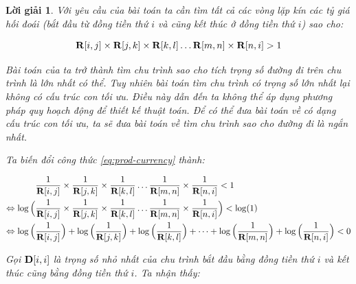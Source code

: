 \documentclass[14pt, a4paper]{article}
\theoremstyle{sltheorem}
\theoremstyle{soltheorem}
\newtheorem*{loigiai}{Lời giải}
\begin{document}
\begin{loigiai}
        Với yêu cầu của bài toán ta cần tìm tất cả các vòng lặp kín các tỷ giá hối đoái (bắt đầu từ đồng tiền thứ $i$ và cũng kết thúc ở đồng tiền thứ $i$) sao cho:


        \begin{equation}
            \bold{R} \lbrack i, j \rbrack \times \bold{R} \lbrack j, k \rbrack \times \bold{R} \lbrack k, l \rbrack \dots \bold{R} \lbrack m, n \rbrack \times \bold{R} \lbrack n, i \rbrack > 1
            \label{eq:prod-currency}
        \end{equation}

        Bài toán của ta trở thành tìm chu trình sao cho tích trọng số đường đi trên chu trình là lớn nhất có thể.
        Tuy nhiên bài toán tìm chu trình có trọng số lớn nhất lại không có cấu trúc con tối ưu.
        Điều này dẫn đến ta không thể áp dụng phương pháp quy hoạch động để thiết kế thuật toán.
        Để có thể đưa bài toán về có dạng cấu trúc con tối ưu, ta sẽ đưa bài toán về tìm chu trình sao cho đường đi là ngắn nhất.

        Ta biến đổi công thức \ref{eq:prod-currency} thành:

        \begin{equation*}
            \begin{aligned}
                &\dfrac{1}{\bold{R} \lbrack i, j \rbrack} \times \dfrac{1}{\bold{R} \lbrack j, k \rbrack} \times \dfrac{1}{\bold{R} \lbrack k, l \rbrack} \dots \dfrac{1}{\bold{R} \lbrack m, n \rbrack} \times \dfrac{1}{\bold{R} \lbrack n, i \rbrack} < 1 \\
                \Leftrightarrow  \log\Big( & \dfrac{1}{\bold{R} \lbrack i, j \rbrack} \times \dfrac{1}{\bold{R} \lbrack j, k \rbrack} \times \dfrac{1}{\bold{R} \lbrack k, l \rbrack} \dots \dfrac{1}{\bold{R} \lbrack m, n \rbrack} \times \dfrac{1}{\bold{R} \lbrack n, i \rbrack} \Big) < \log(1) \\
                \Leftrightarrow \log\Big( & \dfrac{1}{\bold{R} \lbrack i, j \rbrack} \Big) + \log\Big( \dfrac{1}{\bold{R} \lbrack j, k \rbrack} \Big) + \log\Big( \dfrac{1}{\bold{R} \lbrack k, l \rbrack} \Big) + \dots + \log\Big( \dfrac{1}{\bold{R} \lbrack m, n \rbrack} \Big) + \log\Big( \dfrac{1}{\bold{R} \lbrack n, i \rbrack} \Big) < 0
            \end{aligned}
        \end{equation*}

        Gọi $\bold{D} \lbrack i, i \rbrack$ là trọng số nhỏ nhất của chu trình bắt đầu bằng đồng tiền thứ $i$ và kết thúc cũng bằng đồng tiền thứ $i$.
        Ta nhận thấy:


\end{loigiai}
\end{document}
